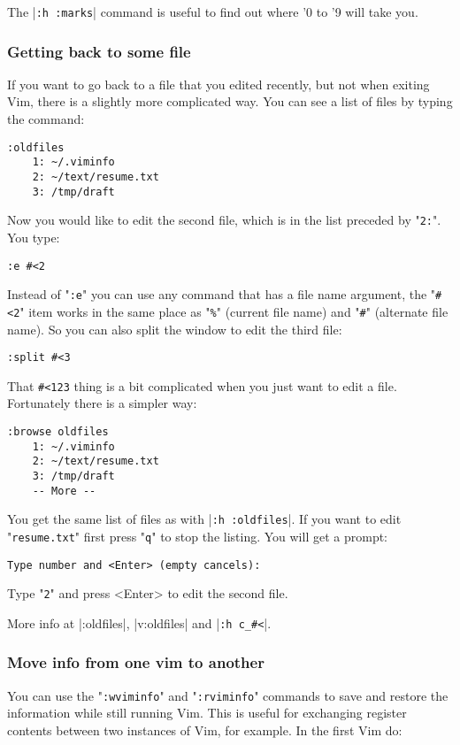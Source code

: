 The |\verb!:h :marks!| command is useful to find out where '0 to '9 will take you.

\subsubsection{Getting back to some file}
If you want to go back to a file that you edited recently, but not when exiting Vim, there is a slightly more complicated way.
You can see a list of files by typing the command:

\begin{Verbatim}[samepage=true]
 :oldfiles
    1: ~/.viminfo 
    2: ~/text/resume.txt 
    3: /tmp/draft 
\end{Verbatim}

Now you would like to edit the second file, which is in the list preceded by "\verb!2:!".
You type:

\begin{Verbatim}[samepage=true]
 :e #<2
\end{Verbatim}

Instead of "\verb!:e!" you can use any command that has a file name argument, the "\verb!#<2!" item works in the same place as "\verb!%!" (current file name) and "\verb!#!" (alternate file name).
So you can also split the window to edit the third file:

\begin{Verbatim}[samepage=true]
 :split #<3
\end{Verbatim}

That \verb!#<123! thing is a bit complicated when you just want to edit a file.
Fortunately there is a simpler way:

\begin{Verbatim}[samepage=true]
 :browse oldfiles
    1: ~/.viminfo 
    2: ~/text/resume.txt 
    3: /tmp/draft 
    -- More --
\end{Verbatim}

You get the same list of files as with |\verb!:h :oldfiles!|.
If you want to edit "\verb!resume.txt!" first press "\verb!q!" to stop the listing.
You will get a prompt:

\begin{Verbatim}[samepage=true]
    Type number and <Enter> (empty cancels): 
\end{Verbatim}

Type "\verb!2!" and press <Enter> to edit the second file.

More info at |:oldfiles|, |v:oldfiles| and |\verb!:h c_#<!|.
\subsubsection{Move info from one vim to another}
You can use the "\verb!:wviminfo!" and "\verb!:rviminfo!" commands to save and restore the information while still running Vim.
This is useful for exchanging register contents between two instances of Vim, for example.
In the first Vim do:

